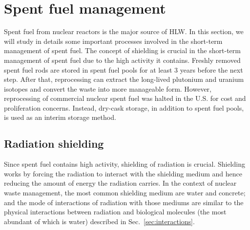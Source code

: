 \documentclass[nofootinbib,preprint,aps]{revtex4-1}
\begin{document}
    \section{Spent fuel management}
    \label{sec:temp}
    Spent fuel from nuclear reactors is the major source of HLW.
    In this section, we will study in details some important processes involved in the short-term management
    of spent fuel.
    The concept of shielding is crucial in the short-term management of spent fuel due to the high activity
    it contains. Freshly removed spent fuel rods are stored in spent fuel pools for at least $3$ years before
    the next step. After that, reprocessing can extract the long-lived plutonium and uranium isotopes and
    convert the waste into more manageable form. However, reprocessing of commercial
    nuclear spent fuel was halted in the U.S. for cost and proliferation concerns. Instead, dry-cask
    storage, in addition to spent fuel pools, is used as an interim storage method.
    \subsection{Radiation shielding}
    Since spent fuel contains high activity, shielding of radiation is crucial. Shielding works by
    forcing the radiation to interact with the shielding medium and hence reducing the amount of energy
    the radiation carries. In the context of nuclear waste management, the most common shielding medium
    are water and concrete; and the mode of interactions of radiation with those mediums are similar to
    the physical interactions between radiation and biological molecules (the most abundant of which is
    water) described in Sec.~\ref{sec:interactions}.
\end{document}
